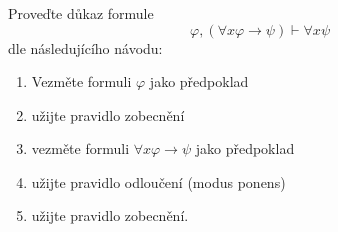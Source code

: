 \subsubsection{}
Proveďte důkaz formule
$$\varphi ,(\forall x\varphi\rightarrow \psi )\vdash \forall x \psi$$
dle následujícího návodu:

\begin{enumerate}
  \item Vezměte formuli $\varphi$ jako předpoklad
  \item užijte pravidlo zobecnění
  \item vezměte formuli $\forall x \varphi \rightarrow \psi $ jako předpoklad
  \item užijte pravidlo odloučení (modus ponens)
  \item užijte pravidlo zobecnění.
\end{enumerate}
